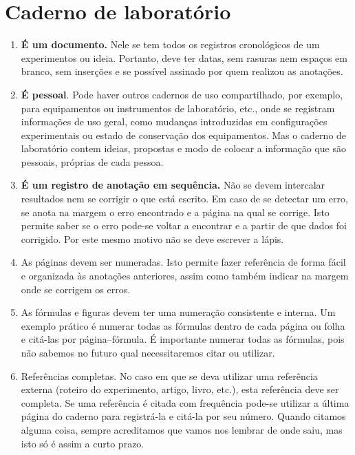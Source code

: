 \chapter{Caderno de laboratório}

\vspace{-0.7cm}

\begin{enumerate}
\item {\bf É um documento.} Nele se tem todos os registros cronológicos de um experimentos ou ideia. Portanto, deve ter datas, sem rasuras nem espaços em branco, sem inserções e se possível assinado por quem realizou as anotações.

\item {\bf É pessoal}. Pode haver outros cadernos de uso compartilhado, por exemplo, para equipamentos ou instrumentos de laboratório, etc., onde se registram informações de uso geral, como mudanças introduzidas em configurações experimentais ou estado de conservação dos equipamentos. Mas o caderno de laboratório contem ideias, propostas e modo de colocar a informação que são pessoais, próprias de cada pessoa.

\item {\bf É um registro de anotação em sequência.} Não se devem intercalar resultados nem se corrigir o que está escrito. Em caso de se detectar um erro, se anota na margem o erro encontrado e a página na qual se corrige. Isto permite saber se o erro pode-se voltar a encontrar e a partir de que dados foi corrigido. Por este mesmo motivo não se deve escrever a lápis.

\item {As páginas devem ser numeradas.} Isto permite fazer referência de forma fácil e organizada às anotações anteriores, assim como também indicar na margem onde se corrigem os erros.

\item {As fórmulas e figuras devem ter uma numeração consistente e interna.} Um exemplo prático é numerar todas as fórmulas dentro de cada página ou folha e citá-las por página–fórmula. É importante numerar todas as fórmulas, pois não sabemos no futuro qual necessitaremos citar ou utilizar.

\item {Referências completas.} No caso em que se deva utilizar uma referência externa (roteiro do experimento, artigo, livro, etc.), esta referência deve ser completa. Se uma referência é citada com frequência pode-se utilizar a última página do caderno para registrá-la e citá-la por seu número. Quando citamos alguma coisa, sempre acreditamos que vamos nos lembrar de onde saiu, mas isto só é assim a curto prazo.


\end{enumerate}
